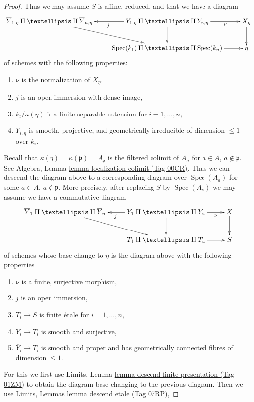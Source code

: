 \documentclass{amsart}
\theoremstyle{plain}
\theoremstyle{definition}
\theoremstyle{remark}
\numberwithin{equation}{subsection}
\def\Spec{\mathop{\mathrm{Spec}}}
\begin{document}
\begin{proof}
\medskip\noindent
Thus we may assume $S$ is affine, reduced, and that we have a diagram
$$
\xymatrix{
\overline{Y}_{1, \eta} \amalg \ldots \amalg \overline{Y}_{n, \eta} \ar[rd] &
Y_{1, \eta} \amalg \ldots \amalg Y_{n, \eta} \ar[r]_-\nu \ar[d] \ar[l]^j &
X_\eta \ar[d] \\
& \Spec(k_1) \amalg \ldots \amalg \Spec(k_n) \ar[r] &
\eta
}
$$
of schemes with the following properties:
\begin{enumerate}
\item $\nu$ is the normalization of $X_\eta$,
\item $j$ is an open immersion with dense image,
\item $k_i/\kappa(\eta)$
is a finite separable extension for $i = 1, \ldots, n$,
\item $\overline{Y}_{i, \eta}$ is smooth, projective, and
geometrically irreducible of dimension $\leq 1$ over $k_i$.
\end{enumerate}
Recall that $\kappa(\eta) = \kappa(\mathfrak p) = A_\mathfrak p$ is
the filtered colimit of $A_a$ for $a \in A$, $a \not \in \mathfrak p$.
See Algebra, Lemma \href{https://stacks.math.columbia.edu/tag/00CR}{lemma localization colimit (Tag 00CR)}.
Thus we can descend the diagram above to a corresponding diagram
over $\Spec(A_a)$ for some $a \in A$, $a \not \in \mathfrak p$.
More precisely, after replacing $S$ by $\Spec(A_a)$
we may assume we have a commutative diagram
$$
\xymatrix{
\overline{Y}_1 \amalg \ldots \amalg \overline{Y}_n \ar[rd] &
Y_1 \amalg \ldots \amalg Y_n \ar[r]_-\nu \ar[d] \ar[l]^j &
X \ar[d] \\
& T_1 \amalg \ldots \amalg T_n \ar[r] & S
}
$$
of schemes whose base change to $\eta$ is the diagram above
with the following properties
\begin{enumerate}
\item $\nu$ is a finite, surjective morphism,
\item $j$ is an open immersion,
\item $T_i \to S$ is finite \'etale for $i = 1, \ldots, n$,
\item $Y_i \to T_i$ is smooth and surjective,
\item $\overline{Y}_i \to T_i$ is smooth and proper and has
geometrically connected fibres of dimension $\leq 1$.
\end{enumerate}
For this we first use
Limits, Lemma \href{https://stacks.math.columbia.edu/tag/01ZM}{lemma descend finite presentation (Tag 01ZM)}
to obtain the diagram base changing to the previous diagram.
Then we use Limits, Lemmas \href{https://stacks.math.columbia.edu/tag/07RP}{lemma descend etale (Tag 07RP)},

\end{proof}
\end{document}
